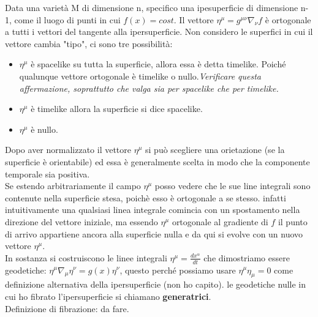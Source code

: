 \documentclass[10pt,a4paper]{article}
\begin{document}
Data una varietà M di dimensione n, specifico una ipesuperficie di dimensione n-1, come il luogo di punti in cui $f(x) = cost$. Il vettore $\eta^{\mu} = g^{\mu \nu} \nabla_{\nu} f$ è ortogonale a tutti i vettori del tangente alla ipersuperficie. 
Non considero le superfici in cui il vettore cambia "tipo", ci sono tre possibilità:
\begin{itemize}
\item $\eta^{\mu}$ è spacelike su tutta la superficie, allora essa è detta timelike. Poiché qualunque vettore ortogonale è timelike o nullo.\emph{Verificare questa affermazione, soprattutto che valga sia per spacelike che per timelike.}
\item $\eta^{\mu}$ è timelike allora la superficie si dice spacelike.
\item $\eta^{\mu}$ è nullo.
\end{itemize}
Dopo aver normalizzato il vettore $\eta^{\mu}$ si può scegliere una orietazione (se la superficie è orientabile) ed essa è generalmente scelta in modo che la componente temporale sia positiva.\\
Se estendo arbitrariamente il campo $\eta^{\mu}$ posso vedere che le sue line integrali sono contenute nella superficie stesa, poichè esso è ortogonale a se stesso. infatti intuitivamente una qualsiasi linea integrale comincia con un spostamento nella direzione del vettore iniziale, ma essendo $\eta^{\mu}$ ortogonale al gradiente di $f$ il punto di arrivo appartiene ancora alla superficie nulla e da qui si evolve con un nuovo vettore $\eta^{\mu}$.\\
In sostanza si costruiscono le linee integrali $\eta^{\mu} =\frac{dx^{\alpha}}{d t}$ che dimostriamo essere geodetiche:
$\eta^{\mu} \nabla_{\mu} \eta^{\nu} = g(x) \eta^{\nu}$, questo perché possiamo usare $\eta^{\mu} \eta_{\mu} = 0$ come definizione alternativa della ipersuperficie (non ho capito).
le geodetiche nulle in cui ho fibrato l'ipersuperficie si chiamano \textbf{generatrici}.\\

Definizione di fibrazione: da fare.\\
\end{document}

